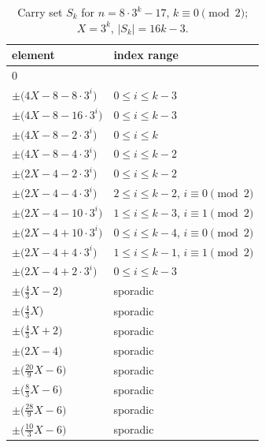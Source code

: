 \begin{table}[htbp]\centering\small
\caption{Carry set $S_k$ for $n=8\cdot 3^k - 17$, $k\equiv 0\pmod{2}$; $X=3^k$, $|S_k|=16k-3$.}
\begin{tabular}{ll}\toprule
element & index range \\ \midrule
$0$ & \\
$\pm\bigl(4X - 8 - 8\cdot 3^i\bigr)$ & $0\le i\le k-3$ \\
$\pm\bigl(4X - 8 - 16\cdot 3^i\bigr)$ & $0\le i\le k-3$ \\
$\pm\bigl(4X - 8 - 2\cdot 3^i\bigr)$ & $0\le i\le k$ \\
$\pm\bigl(4X - 8 - 4\cdot 3^i\bigr)$ & $0\le i\le k-2$ \\
$\pm\bigl(2X - 4 - 2\cdot 3^i\bigr)$ & $0\le i\le k-2$ \\
$\pm\bigl(2X - 4 - 4\cdot 3^i\bigr)$ & $2\le i\le k-2$, $i\equiv 0\pmod 2$ \\
$\pm\bigl(2X - 4 - 10\cdot 3^i\bigr)$ & $1\le i\le k-3$, $i\equiv 1\pmod 2$ \\
$\pm\bigl(2X - 4 + 10\cdot 3^i\bigr)$ & $0\le i\le k-4$, $i\equiv 0\pmod 2$ \\
$\pm\bigl(2X - 4 + 4\cdot 3^i\bigr)$ & $1\le i\le k-1$, $i\equiv 1\pmod 2$ \\
$\pm\bigl(2X - 4 + 2\cdot 3^i\bigr)$ & $0\le i\le k-3$ \\
$\pm\bigl(\tfrac{4}{3}X - 2\bigr)$ & sporadic \\
$\pm\bigl(\tfrac{4}{3}X\bigr)$ & sporadic \\
$\pm\bigl(\tfrac{4}{3}X + 2\bigr)$ & sporadic \\
$\pm\bigl(2X - 4\bigr)$ & sporadic \\
$\pm\bigl(\tfrac{20}{9}X - 6\bigr)$ & sporadic \\
$\pm\bigl(\tfrac{8}{3}X - 6\bigr)$ & sporadic \\
$\pm\bigl(\tfrac{28}{9}X - 6\bigr)$ & sporadic \\
$\pm\bigl(\tfrac{10}{3}X - 6\bigr)$ & sporadic \\
\bottomrule\end{tabular}\end{table}

